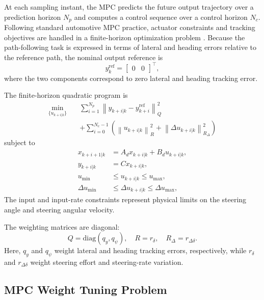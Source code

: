 \documentclass[10pt,twocolumn]{ICCAS}
\begin{document}
At each sampling instant, the MPC predicts the future output trajectory over a
prediction horizon $N_p$ and computes a control sequence over a control horizon
$N_c$. Following standard automotive MPC practice, actuator constraints and
tracking objectives are handled in a finite-horizon optimization problem
\cite{maull2022optimizing}. Because the path-following task is expressed in
terms of lateral and heading errors relative to the reference path, the nominal
output reference is
\begin{equation}
y^{\mathrm{ref}}_k =
\begin{bmatrix}
0 & 0
\end{bmatrix}^{\top},
\label{eq:reference_output}
\end{equation}
where the two components correspond to zero lateral and heading tracking error.

The finite-horizon quadratic program is
\begin{align}
\min_{\{u_{k+i|k}\}} \quad
& \sum_{i=1}^{N_p}
\left\| y_{k+i|k} - y^{\mathrm{ref}}_{k+i} \right\|_Q^2
\nonumber\\
&+
\sum_{i=0}^{N_c-1}
\left(
\left\| u_{k+i|k} \right\|_R^2
+
\left\| \Delta u_{k+i|k} \right\|_{R_\Delta}^2
\right)
\label{eq:mpc_qp}
\end{align}
subject to
\begin{align}
x_{k+i+1|k} &= A_d x_{k+i|k} + B_d u_{k+i|k}, \nonumber\\
y_{k+i|k} &= Cx_{k+i|k}, \nonumber\\
u_{\min} &\leq u_{k+i|k} \leq u_{\max}, \nonumber\\
\Delta u_{\min} &\leq \Delta u_{k+i|k} \leq \Delta u_{\max},
\label{eq:mpc_constraints}
\end{align}
The input and input-rate constraints represent physical limits on the steering
angle and steering angular velocity.

The weighting matrices are diagonal:
\begin{equation}
Q = \mathrm{diag}(q_y,q_\psi), \quad
R = r_\delta, \quad
R_\Delta = r_{\Delta\delta}.
\label{eq:mpc_weights}
\end{equation}
Here, $q_y$ and $q_\psi$ weight lateral and heading tracking errors,
respectively, while $r_\delta$ and $r_{\Delta\delta}$ weight steering effort and
steering-rate variation.

\subsection{MPC Weight Tuning Problem}
\label{subsec:mpc_weights}
\end{document}
